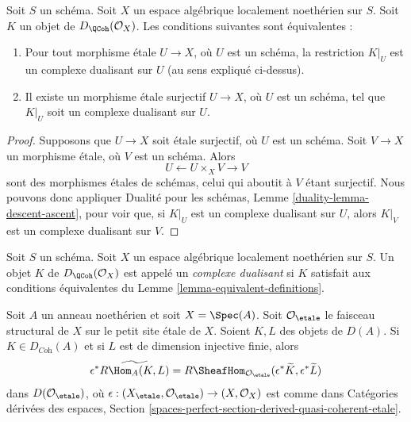 \begin{lemma}
\label{lemma-equivalent-definitions}
Soit $S$ un schéma. Soit $X$ un espace algébrique localement noethérien sur $S$.
Soit $K$ un objet de $D_\QCoh(\mathcal{O}_X)$. Les conditions suivantes sont équivalentes :
\begin{enumerate}
\item Pour tout morphisme \'etale $U \to X$, où $U$ est un schéma,
la restriction $K|_U$ est un complexe dualisant sur $U$ (au sens expliqué ci-dessus).
\item Il existe un morphisme \'etale surjectif $U \to X$, où $U$ est un
schéma, tel que $K|_U$ soit un complexe dualisant sur $U$.
\end{enumerate}
\end{lemma}

\begin{proof}
Supposons que $U \to X$ soit \'etale surjectif, où $U$ est un schéma.
Soit $V \to X$ un morphisme \'etale, où $V$ est un schéma.
Alors
$$
U \leftarrow U \times_X V \rightarrow V
$$
sont des morphismes \'etales de schémas, celui qui aboutit à $V$ étant surjectif.
Nous pouvons donc appliquer Dualité pour les schémas, Lemme \ref{duality-lemma-descent-ascent},
pour voir que, si $K|_U$ est un complexe dualisant sur $U$, alors
$K|_V$ est un complexe dualisant sur $V$.
\end{proof}

\begin{definition}
\label{definition-dualizing-scheme}
Soit $S$ un schéma.
Soit $X$ un espace algébrique localement noethérien sur $S$.
Un objet $K$ de $D_\QCoh(\mathcal{O}_X)$ est appelé un
{\it complexe dualisant} si $K$ satisfait aux conditions équivalentes du
Lemme \ref{lemma-equivalent-definitions}.
\end{definition}

\begin{lemma}
\label{lemma-affine-duality}
Soit $A$ un anneau noethérien et soit $X = \Spec(A)$. Soit
$\mathcal{O}_\etale$ le faisceau structural de $X$ sur le
petit site \'etale de $X$. Soient $K, L$ des objets de $D(A)$.
Si $K \in D_{\textit{Coh}}(A)$ et si $L$ est de dimension injective
finie, alors
$$
\epsilon^*\widetilde{R\Hom_A(K, L)} =
R\SheafHom_{\mathcal{O}_\etale}(\epsilon^*\widetilde{K},
\epsilon^*\widetilde{L})
$$
dans $D(\mathcal{O}_\etale)$, où
$\epsilon : (X_\etale, \mathcal{O}_\etale) \to (X, \mathcal{O}_X)$
est comme dans Catégories dérivées des espaces, Section
\ref{spaces-perfect-section-derived-quasi-coherent-etale}.
\end{lemma}

